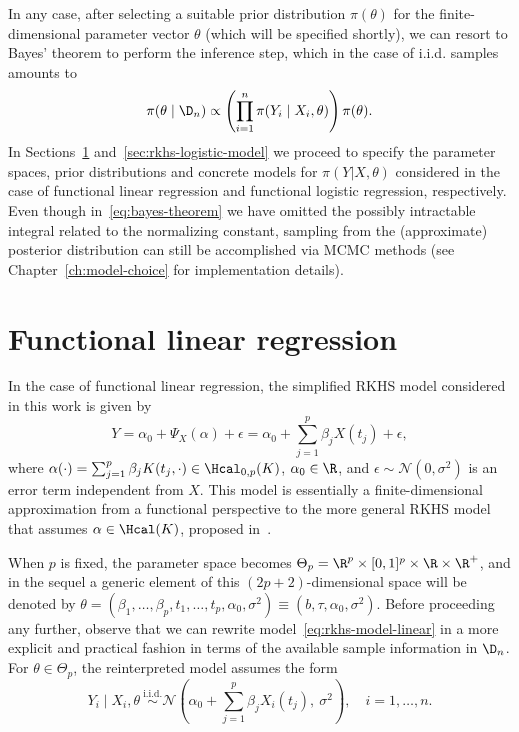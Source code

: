 In any case, after selecting a suitable prior distribution \(\pi(\theta)\) for the finite-dimensional parameter vector \(\theta\) (which will be specified shortly), we can resort to Bayes' theorem to perform the inference step, which in the case of i.i.d. samples amounts to
\begin{equation}\label{eq:bayes-theorem}
  \pi(\theta \mid \D_n) \propto \left( \prod_{i=1}^n \pi(Y_i\mid X_i, \theta) \right)\pi(\theta).
\end{equation}
In Sections~\ref{sec:rkhs-linear-model} and~\ref{sec:rkhs-logistic-model} we proceed to specify the parameter spaces, prior distributions and concrete models for \(\pi(Y | X,\theta)\) considered in the case of functional linear regression and functional logistic regression, respectively. Even though in~\eqref{eq:bayes-theorem} we have omitted the possibly intractable integral related to the normalizing constant, sampling from the (approximate) posterior distribution can still be accomplished via MCMC methods (see Chapter~\ref{ch:model-choice} for implementation details).

\section{Functional linear regression}\label{sec:rkhs-linear-model}

In the case of functional linear regression, the simplified RKHS model considered in this work is given by
\begin{equation}\label{eq:rkhs-model-linear}
  Y = \alpha_0 + \Psi_X(\alpha) + \epsilon = \alpha_0 + \sum_{j=1}^p \beta_j X(t_j) + \epsilon,
\end{equation}
where \(\alpha(\cdot) = \sum_{j=1}^p \beta_j K(t_j, \cdot) \in \Hcal_{0,p}(K)\), \(\alpha_0\in\R\), and \(\epsilon \sim \mathcal N(0, \sigma^2)\) is an error term independent from \(X\). This model is essentially a finite-dimensional approximation from a functional perspective to the more general RKHS model that assumes \(\alpha \in \Hcal(K)\), proposed in~\citet{berrendero2019rkhs}.

When \(p\) is fixed, the parameter space becomes \(\Theta_p = \R^p \times [0, 1]^p \times \R \times \R^+\), and in the sequel a generic element of this \((2p+2)\)-dimensional space will be denoted by \(\theta = (\beta_1,\dots, \beta_p, t_1,\dots, t_p, \alpha_0, \sigma^2) \equiv (b, \tau, \alpha_0, \sigma^2)\). Before proceeding any further, observe that we can rewrite model~\eqref{eq:rkhs-model-linear} in a more explicit and practical fashion in terms of the available sample information in \(\D_n\). For \(\theta \in \Theta_p\), the reinterpreted model assumes the form
\begin{equation}\label{eq:rkhs-model-linear-2}
  Y_i \mid X_i, \theta \ \stackrel{\text{i.i.d.}}{\sim} \mathcal N\left(\alpha_0 + \sum_{j=1}^p \beta_j X_i(t_j), \ \sigma^2\right), \quad i =1,\dots, n.
\end{equation}

